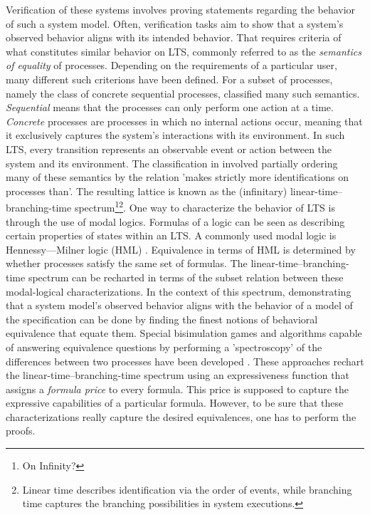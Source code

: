 \begin{isabellebody}
\begin{isamarkuptext}
Verification of these systems involves proving statements regarding the behavior of such a system model. Often, verification tasks aim to show that a system's observed behavior aligns with its intended behavior.
That requires criteria of what constitutes similar behavior on LTS, commonly referred to as the \textit{semantics of equality} of processes. Depending on the requirements of a particular user, many different such criterions have been defined.
For a subset of processes, namely the class of concrete sequential processes, \cite{GLABBEEK20013} classified many such semantics. 
\textit{Sequential} means that the processes can only perform one action at a time. \textit{Concrete} processes are processes in which no internal actions occur, meaning that it exclusively captures the system's interactions with its environment.
In such LTS, every transition represents an observable event or action between the system and its environment.
The classification in \cite{GLABBEEK20013} involved partially ordering many of these semantics by the relation 'makes strictly more identifications on processes than'. The resulting lattice is
known as the (infinitary) linear-time--branching-time spectrum\footnote{On Infinity?}\footnote{Linear time describes identification via the order of events, while branching time captures the branching possibilities in system executions.}.
One way to characterize the behavior of LTS is through the use of modal logics. Formulas of a logic can be seen as describing certain properties of states within an LTS. A commonly used modal logic is Hennessy---Milner logic (HML) \cite{hm85}. 
Equivalence in terms of HML is determined by whether processes satisfy the same set of formulas. The linear-time--branching-time spectrum can be recharted in terms of the subset relation between these modal-logical characterizations. 
In the context of this spectrum, demonstrating that a system model's observed behavior aligns with the behavior of a model of the specification can be done by 
finding the finest notions of behavioral equivalence that equate them. Special bisimulation games and algorithms capable of answering equivalence questions 
by performing a 'spectroscopy' of the differences between two processes have been developed \cite{bisping2022deciding}\cite{bisping2023process}.
These approaches rechart the linear-time--branching-time spectrum using an expressiveness function that assigns a \textit{formula price} to every formula. 
This price is supposed to capture the expressive capabilities of a particular formula. However, to be sure that these characterizations really capture the desired equivalences, one has to perform the proofs.%

\end{isamarkuptext}
\end{isabellebody}
